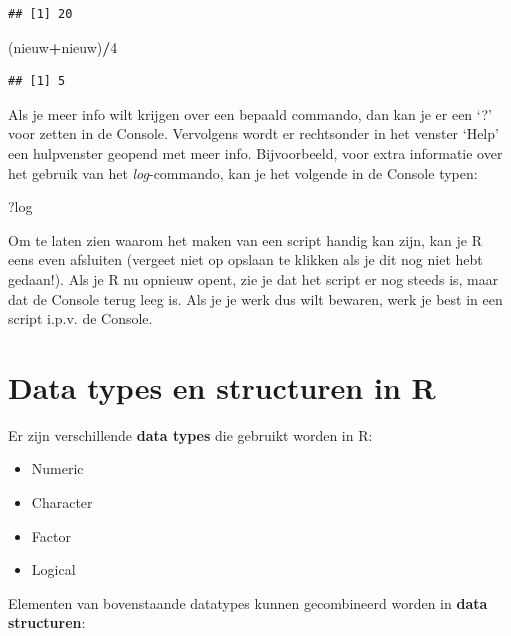 \documentclass[
]{book}
\newenvironment{Shaded}{\begin{snugshade}}{\end{snugshade}}
\newcommand{\DecValTok}[1]{\textcolor[rgb]{0.00,0.00,0.81}{#1}}
\newcommand{\NormalTok}[1]{#1}
\newcommand{\SpecialCharTok}[1]{\textcolor[rgb]{0.81,0.36,0.00}{\textbf{#1}}}
\providecommand{\tightlist}{%
  \setlength{\itemsep}{0pt}\setlength{\parskip}{0pt}}
\begin{document}
\begin{verbatim}
## [1] 20
\end{verbatim}

\begin{Shaded}
\begin{Highlighting}[]
\NormalTok{(nieuw}\SpecialCharTok{+}\NormalTok{nieuw)}\SpecialCharTok{/}\DecValTok{4}
\end{Highlighting}
\end{Shaded}

\begin{verbatim}
## [1] 5
\end{verbatim}

Als je meer info wilt krijgen over een bepaald commando, dan kan je er een `?' voor zetten
in de Console. Vervolgens wordt er rechtsonder in het venster `Help' een hulpvenster geopend met meer info. Bijvoorbeeld, voor extra informatie over het gebruik van het \emph{log}-commando, kan je het volgende in de Console typen:

\begin{Shaded}
\begin{Highlighting}[]
\NormalTok{?log}
\end{Highlighting}
\end{Shaded}

Om te laten zien waarom het maken van een script handig kan zijn, kan je R eens even afsluiten (vergeet niet op opslaan te klikken als je dit nog niet hebt gedaan!). Als je R nu opnieuw opent, zie je dat het script er nog steeds is, maar dat de Console terug leeg is. Als je je werk dus wilt bewaren, werk je best in een script i.p.v. de Console.

\hypertarget{data-types-en-structuren-in-r}{%
\chapter{Data types en structuren in R}\label{data-types-en-structuren-in-r}}

Er zijn verschillende \textbf{data types} die gebruikt worden in R:

\begin{itemize}
\tightlist
\item
  Numeric
\item
  Character
\item
  Factor
\item
  Logical
\end{itemize}

Elementen van bovenstaande datatypes kunnen gecombineerd worden in \textbf{data structuren}:
\end{document}
